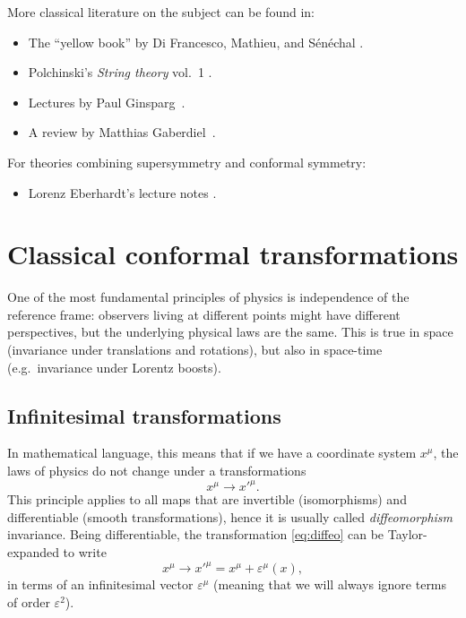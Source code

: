 \documentclass[a4paper,12pt]{article}
\numberwithin{equation}{section}
\begin{document}
More classical literature on the subject can be found in:
\begin{itemize}

\item
The ``yellow book'' by Di Francesco, Mathieu, and Sénéchal
\cite{DiFrancesco:1997nk}.

\item
Polchinski's \emph{String theory} vol.~1
\cite{Polchinski:1998rq}.

\item
Lectures by Paul Ginsparg~\cite{Ginsparg:1988ui}.

\item
A review by Matthias Gaberdiel~\cite{Gaberdiel:1999mc}.

\end{itemize}
%
For theories combining supersymmetry and conformal symmetry:
\begin{itemize}

\item
Lorenz Eberhardt's lecture notes 
\cite{Eberhardt:2020cxo}.

\end{itemize}


\section{Classical conformal transformations}
\label{sec:classical}

One of the most fundamental principles of physics is independence of the reference frame: observers living at different points might have different perspectives, but the underlying physical laws are the same.
This is true in space (invariance under translations and rotations), but also in space-time (e.g.~invariance under Lorentz boosts).

\subsection{Infinitesimal transformations}

In mathematical language, this means that if we have a coordinate system $x^\mu$, the laws of physics do not change under a transformations 
\begin{equation}
	x^\mu \to x'^\mu.
	\label{eq:diffeo}
\end{equation}
This principle applies to all maps that are invertible (isomorphisms) and differentiable (smooth transformations), hence it is usually called \emph{diffeomorphism} invariance.
Being differentiable, the transformation \eqref{eq:diffeo} can be Taylor-expanded to write
\begin{equation}
	x^\mu \to x'^\mu = x^\mu + \varepsilon^\mu(x),
	\label{eq:diffeo:infinitesimal}
\end{equation}
in terms of an infinitesimal vector $\varepsilon^\mu$ (meaning that we will always ignore terms of order $\varepsilon^2$).
\end{document}
